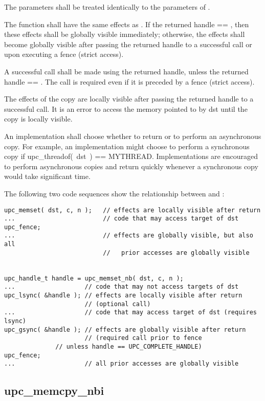 \npf The parameters shall be treated identically to the parameters of
\memset{}.

\np The \function{} function shall have the same effects as \memset{}.
If the returned handle == \complete{}, then these effects shall be globally
visible immediately; otherwise, the effects shall become globally visible after
passing the returned handle to a successful \gsync{} call or upon executing a
fence (strict access).

\np A successful \gsync{} call shall be made using the returned handle,
unless the returned handle == \complete{}.  The call is required even if it is
preceded by a fence (strict access).

\np The effects of the copy are locally visible after passing the
returned handle to a successful \lsync{} call.  It is an error to access the
memory pointed to by dst until the copy is locally visible.

\np An implementation shall choose whether to return \complete{} or
to perform an asynchronous copy.  For example, an implementation might
choose to perform a synchronous copy if upc\_threadof(~dst~) == MYTHREAD.
Implementations are encouraged to perform asynchronous copies and return
quickly whenever a synchronous copy would take significant time.

\np The following two code sequences show the relationship between
\memset{} and \function{}:

\begin{verbatim}
upc_memset( dst, c, n );   // effects are locally visible after return
...                        // code that may access target of dst
upc_fence;                 
...                        // effects are globally visible, but also all
                           //   prior accesses are globally visible


upc_handle_t handle = upc_memset_nb( dst, c, n );
...                   // code that may not access targets of dst
upc_lsync( &handle ); // effects are locally visible after return
                      // (optional call)
...                   // code that may access target of dst (requires lsync)
upc_gsync( &handle ); // effects are globally visible after return
                      // (required call prior to fence
		      // unless handle == UPC_COMPLETE_HANDLE)
upc_fence;
...                   // all prior accesses are globally visible
\end{verbatim}

\newpage
\subsection{upc\_memcpy\_nbi}
\def\function{{\tt upc\_memcpy\_nbi}}


